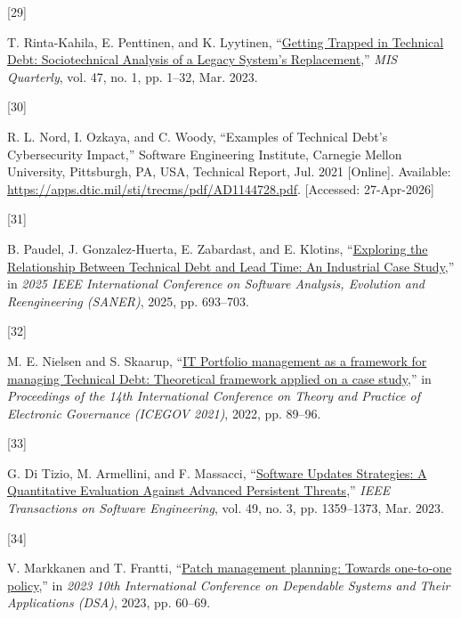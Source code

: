 \documentclass[
  journal,
]{IEEEtran}%
\newlength{\cslhangindent}
\newlength{\csllabelwidth}
\newenvironment{CSLReferences}[2] %
 {\begin{list}{}{%
  \setlength{\itemindent}{0pt}
  \setlength{\leftmargin}{0pt}
  \setlength{\parsep}{0pt}
  \ifodd #1
   \setlength{\leftmargin}{\cslhangindent}
   \setlength{\itemindent}{-1\cslhangindent}
  \fi
  \setlength{\itemsep}{#2\baselineskip}}}
 {\end{list}}
\newcommand{\CSLLeftMargin}[1]{\parbox[t]{\csllabelwidth}{\strut#1\strut}}
\newcommand{\CSLRightInline}[1]{\parbox[t]{\linewidth - \csllabelwidth}{\strut#1\strut}}
\begin{document}
\begin{CSLReferences}{0}{0}
\CSLLeftMargin{{[}29{]} }%
\CSLRightInline{T. Rinta-Kahila, E. Penttinen, and K. Lyytinen,
{``\href{https://doi.org/10.25300/MISQ/2022/16711}{Getting {Trapped} in
{Technical Debt}: {Sociotechnical Analysis} of a {Legacy System}'s
{Replacement}},''} \emph{MIS Quarterly}, vol. 47, no. 1, pp. 1--32, Mar.
2023. }

\CSLLeftMargin{{[}30{]} }%
\CSLRightInline{R. L. Nord, I. Ozkaya, and C. Woody, {``Examples of
{Technical Debt}'s {Cybersecurity Impact},''} Software Engineering
Institute, Carnegie Mellon University, Pittsburgh, PA, USA, Technical
Report, Jul. 2021 {[}Online{]}. Available:
\url{https://apps.dtic.mil/sti/trecms/pdf/AD1144728.pdf}. {[}Accessed:
27-Apr-2026{]}}

\CSLLeftMargin{{[}31{]} }%
\CSLRightInline{B. Paudel, J. Gonzalez-Huerta, E. Zabardast, and E.
Klotins,
{``\href{https://doi.org/10.1109/SANER64311.2025.00071}{Exploring the
{Relationship Between Technical Debt} and {Lead Time}: {An Industrial
Case Study}},''} in \emph{2025 {IEEE International Conference} on
{Software Analysis}, {Evolution} and {Reengineering} ({SANER})}, 2025,
pp. 693--703. }

\CSLLeftMargin{{[}32{]} }%
\CSLRightInline{M. E. Nielsen and S. Skaarup,
{``\href{https://doi.org/10.1145/3494193.3494296}{{IT Portfolio}
management as a framework for managing {Technical Debt}: {Theoretical}
framework applied on a case study},''} in \emph{Proceedings of the 14th
{International Conference} on {Theory} and {Practice} of {Electronic
Governance} ({ICEGOV} 2021)}, 2022, pp. 89--96. }

\CSLLeftMargin{{[}33{]} }%
\CSLRightInline{G. Di Tizio, M. Armellini, and F. Massacci,
{``\href{https://doi.org/10.1109/TSE.2022.3176674}{Software {Updates
Strategies}: {A Quantitative Evaluation Against Advanced Persistent
Threats}},''} \emph{IEEE Transactions on Software Engineering}, vol. 49,
no. 3, pp. 1359--1373, Mar. 2023. }

\CSLLeftMargin{{[}34{]} }%
\CSLRightInline{V. Markkanen and T. Frantti,
{``\href{https://doi.org/10.1109/DSA59317.2023.00018}{Patch management
planning: {Towards} one-to-one policy},''} in \emph{2023 10th
{International Conference} on {Dependable Systems} and {Their
Applications} ({DSA})}, 2023, pp. 60--69. }


\end{CSLReferences}
\end{document}
